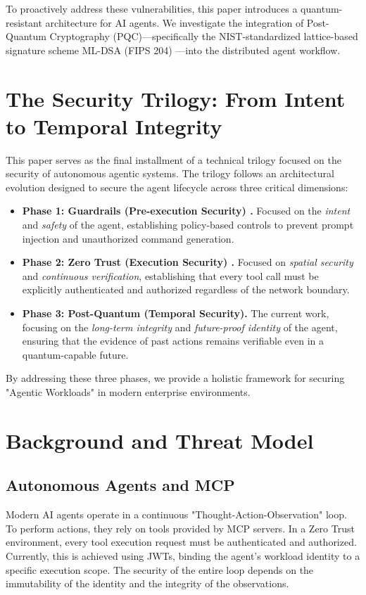 \documentclass[conference]{IEEEtran}
\begin{document}
To proactively address these vulnerabilities, this paper introduces a quantum-resistant architecture for AI agents. We investigate the integration of Post-Quantum Cryptography (PQC)---specifically the NIST-standardized lattice-based signature scheme ML-DSA (FIPS 204) \cite{nistfips204}---into the distributed agent workflow. 

\section{The Security Trilogy: From Intent to Temporal Integrity}
This paper serves as the final installment of a technical trilogy focused on the security of autonomous agentic systems. The trilogy follows an architectural evolution designed to secure the agent lifecycle across three critical dimensions:

\begin{itemize}
    \item \textbf{Phase 1: Guardrails (Pre-execution Security) \cite{ando2026guardrails}.} Focused on the \textit{intent} and \textit{safety} of the agent, establishing policy-based controls to prevent prompt injection and unauthorized command generation.
    \item \textbf{Phase 2: Zero Trust (Execution Security) \cite{ando2026zerotrust}.} Focused on \textit{spatial security} and \textit{continuous verification}, establishing that every tool call must be explicitly authenticated and authorized regardless of the network boundary.
    \item \textbf{Phase 3: Post-Quantum (Temporal Security).} The current work, focusing on the \textit{long-term integrity} and \textit{future-proof identity} of the agent, ensuring that the evidence of past actions remains verifiable even in a quantum-capable future.
\end{itemize}

By addressing these three phases, we provide a holistic framework for securing "Agentic Workloads" in modern enterprise environments.

\section{Background and Threat Model}

\subsection{Autonomous Agents and MCP}
Modern AI agents operate in a continuous "Thought-Action-Observation" loop. To perform actions, they rely on tools provided by MCP servers. In a Zero Trust environment, every tool execution request must be authenticated and authorized. Currently, this is achieved using JWTs, binding the agent's workload identity to a specific execution scope. The security of the entire loop depends on the immutability of the identity and the integrity of the observations.
\end{document}
